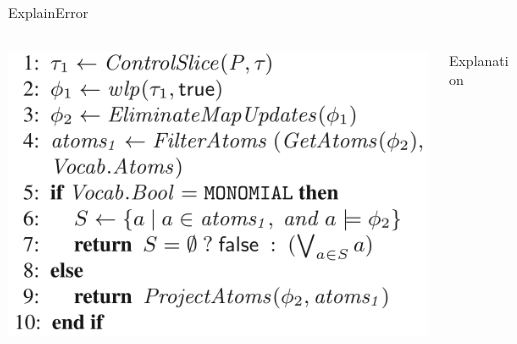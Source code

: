 \documentclass[11pt]{beamer}
\begin{document}

\begin{frame}{ExplainError}
\begin{columns}

\begin{column}{0.5\textwidth}
\includegraphics[width=0.9\linewidth]{img/explainErrorShort.png}
\end{column}

\begin{column}{0.5\textwidth}
Explanation
\end{column}

\end{columns}
\end{frame}
\end{document}
